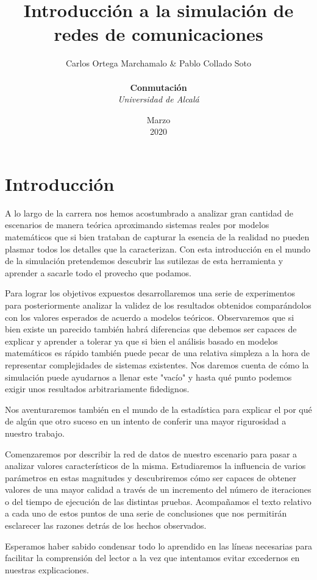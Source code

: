 \documentclass{article}[10pt]
\title{Introducción a la simulación de redes de comunicaciones}
\author{Carlos Ortega Marchamalo \& Pablo Collado Soto \\ \\ \textbf{Conmutación} \\ \textit{Universidad de Alcalá}}
\date{Marzo \\ 2020}
\begin{document}
	\begin{titlingpage}
		\maketitle
	\end{titlingpage}

	\tableofcontents
	\newpage

	\section{Introducción}
		A lo largo de la carrera nos hemos acostumbrado a analizar gran cantidad de escenarios de manera teórica aproximando sistemas reales por modelos matemáticos que si bien trataban de capturar la esencia de la realidad no pueden plasmar todos los detalles que la caracterizan. Con esta introducción en el mundo de la simulación pretendemos descubrir las sutilezas de esta herramienta y aprender a sacarle todo el provecho que podamos.

		Para lograr los objetivos expuestos desarrollaremos una serie de experimentos para posteriormente analizar la validez de los resultados obtenidos comparándolos con los valores esperados de acuerdo a modelos teóricos. Observaremos que si bien existe un parecido también habrá diferencias que debemos ser capaces de explicar y aprender a tolerar ya que si bien el análisis basado en modelos matemáticos es rápido también puede pecar de una relativa simpleza a la hora de representar complejidades de sistemas existentes. Nos daremos cuenta de cómo la simulación puede ayudarnos a llenar este "vacío" y hasta qué punto podemos exigir unos resultados arbitrariamente fidedignos.

		Nos aventuraremos también en el mundo de la estadística para explicar el por qué de algún que otro suceso en un intento de conferir una mayor rigurosidad a nuestro trabajo.

		Comenzaremos por describir la red de datos de nuestro escenario para pasar a analizar valores característicos de la misma. Estudiaremos la influencia de varios parámetros en estas magnitudes y descubriremos cómo ser capaces de obtener valores de una mayor calidad a través de un incremento del número de iteraciones o del tiempo de ejecución de las distintas pruebas. Acompañamos el texto relativo a cada uno de estos puntos de una serie de conclusiones que nos permitirán esclarecer las razones detrás de los hechos observados.

		Esperamos haber sabido condensar todo lo aprendido en las líneas necesarias para facilitar la comprensión del lector a la vez que intentamos evitar excedernos en nuestras explicaciones.
\end{document}
